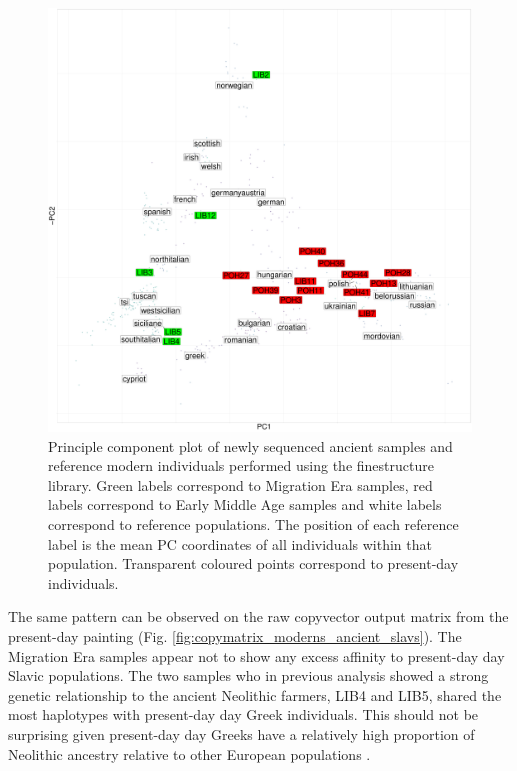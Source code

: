 \begin{figure}[htp]
    \centering
    \includegraphics[width=1.0\textwidth]{../images/chapter5/chunklengths_moderns_ancients_PCA.pdf}
    \caption{Principle component plot of newly sequenced ancient samples and reference modern individuals performed using the finestructure library. Green labels correspond to Migration Era samples, red labels correspond to Early Middle Age samples and white labels correspond to reference populations. The position of each reference label is the mean PC coordinates of all individuals within that population. Transparent coloured points correspond to present-day individuals.}
    \label{fig:chunklengths_moderns_ancients_PCA}
\end{figure}

The same pattern can be observed on the raw copyvector output matrix from the present-day painting (Fig. \ref{fig:copymatrix_moderns_ancient_slavs}). The Migration Era samples appear not to show any excess affinity to present-day day Slavic populations. The two samples who in previous analysis showed a strong genetic relationship to the ancient Neolithic farmers, LIB4 and LIB5, shared the most haplotypes with present-day day Greek individuals. This should not be surprising given present-day day Greeks have a relatively high proportion of Neolithic ancestry relative to other European populations \cite{lazaridis2017genetic}. 

